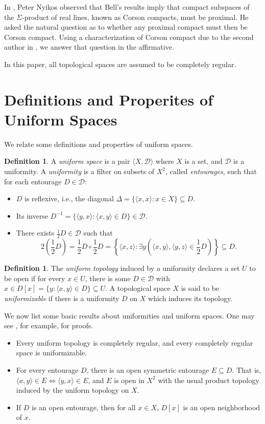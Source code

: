 \documentclass{amsart}
\theoremstyle{definition}
\newtheorem{defn}[thm]{Definition}
\theoremstyle{remark}
\newcommand{\mc}{\mathcal}
\newcommand{\<}{\langle}
\renewcommand{\>}{\rangle}
\newcommand{\term}{\textit}
\begin{document}
In \cite{nproximal}, Peter Nyikos observed that Bell's results imply that compact subspaces of the $\Sigma$-product of real lines, known as Corson compacts, must be proximal. He asked the natural question as to whether any proximal compact must then be Corson compact. Using a characterization of Corson compact due to the second author in \cite{gcovering}, we  answer that question in the affirmative.


In this paper, all topological spaces are assumed to be completely regular.

\section{Definitions and Properites of Uniform Spaces}
 We relate some definitions and properties of uniform spaces.

\begin{defn}
  A \term{uniform space} is a pair $\<X,\mc{D}\>$ where $X$ is a set, and $\mc{D}$ is a uniformity. A \term{uniformity} is a filter on subsets of $X^2$, called \term{entourages}, such that for each entourage $D\in \mc D$:
  \begin{itemize}
      \item $D$ is reflexive, i.e., the diagonal $\Delta=\{\<x,x\>:x\in X\}\subseteq D$.
      \item Its inverse $D^{-1}=\{\<y,x\>:\<x,y\>\in D\}\in \mc D$.
      \item There exists $\frac{1}{2}D\in\mc D$ such that
        \[
          2\left(\frac{1}{2}D\right)=\frac{1}{2}D\circ \frac{1}{2}D=\left\{\<x,z\>:\exists y\left(\<x,y\>,\<y,z\>\in \frac{1}{2}D\right)\right\}\subseteq D.
        \]
    \end{itemize}
\end{defn}

\begin{defn}
  The \term{uniform topology} induced by a uniformity declares a set $U$ to be open if for every $x\in U$, there is some $D\in\mc D$ with $x\in D[x]=\{y: \<x,y\>\in D\}\subseteq U$.   A topological space $X$ is said to be \term{uniformizable} if there is a uniformity $D$ on $X$ which induces its topology.
\end{defn}

We now list some basic results about uniformities and uniform spaces.  One may see \cite{e}, for example, for proofs.



\begin{itemize}
 \item Every uniform topology is completely regular, and every completely regular space is uniformizable.
\item  For every entourage $D$, there is an open symmetric entourage $E\subseteq D$. That is, $\<x,y\>\in E \Leftrightarrow \<y,x\> \in E$, and $E$ is open in $X^2$ with the usual product topology induced by the uniform topology on $X$.
\item  If $D$ is an open entourage, then for all $x\in X$, $D[x]$ is an open neighborhood of $x$.
\end{itemize}
\end{document}
